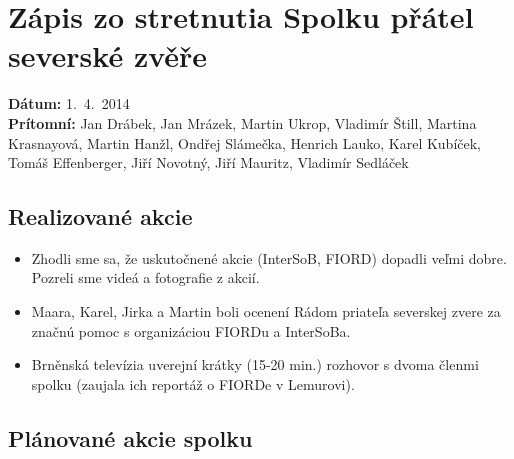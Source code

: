 \documentclass[11pt,a4paper]{article}
\begin{document}
\section*{Zápis zo stretnutia Spolku přátel severské zvěře}
\textbf{Dátum:} 1.\ 4.\ 2014\\
\textbf{Prítomní:} Jan Drábek, Jan Mrázek, Martin Ukrop, Vladimír Štill, Martina Krasnayová, Martin Hanžl, Ondřej Slámečka, Henrich Lauko, Karel Kubíček, Tomáš Effenberger, Jiří Novotný, Jiří Mauritz, Vladimír Sedláček

\subsection*{Realizované akcie}
\begin{itemize}[itemsep=0pt]
\item Zhodli sme sa, že uskutočnené akcie (InterSoB, FIORD) dopadli veľmi dobre. Pozreli sme videá a fotografie z akcií.
\item Maara, Karel, Jirka a Martin boli ocenení Rádom priateľa severskej zvere za značnú pomoc s organizáciou FIORDu a InterSoBa.
\item Brněnská televízia uverejní krátky (15-20 min.) rozhovor s dvoma členmi spolku (zaujala ich reportáž o FIORDe v Lemurovi).
\end{itemize}

\subsection*{Plánované akcie spolku}
\end{document}
